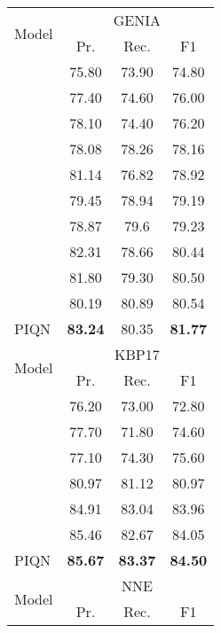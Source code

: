 \documentclass[11pt]{article}
\begin{document}
\begin{table}[]
\begin{tabular}{lccc}
\toprule
\multirow{2}{*}{Model}   & \multicolumn{3}{c}{GENIA}  \\
 \cmidrule(lr){2-4} 
& Pr.  & Rec. & F1  \\
\midrule

\citet{lin-etal-2019-sequence}       & 75.80  & 73.90 & 74.80  \\
\citet{luo-zhao-2020-bipartite}       & 77.40  & 74.60  & 76.00    \\
\citet{wang-etal-2020-hit}       & 78.10  & 74.40  & 76.20  \\
\citet{yang2022}  & 78.08 & 78.26 & 78.16 \\
\citet{li-etal-2020-unified} & 81.14 & 76.82 & 78.92 \\

\citet{wang-etal-2020-pyramid}       & 79.45  & 78.94  & 79.19     \\
\citet{yan2021bartner}  & 78.87  & 79.6  & 79.23     \\
\citet{tan2021sequencetoset}  & 82.31  & 78.66  & 80.44     \\
\citet{yu-etal-2020-named}       & 81.80  & 79.30  & 80.50     \\
\citet{shen2021locateandlabel} & 80.19 & 80.89  & 80.54  \\
\midrule
PIQN    & \textbf{83.24} & 80.35 & \textbf{81.77} \\
\toprule
\multirow{2}{*}{Model}   & \multicolumn{3}{c}{KBP17}  \\
 \cmidrule(lr){2-4} 
& Pr.  & Rec. & F1  \\
\midrule



\citet{DBLP:conf/tac/JiPZNMMC17}       & 76.20 & 73.00 & 72.80  \\
\citet{lin-etal-2019-sequence}       & 77.70  & 71.80 & 74.60  \\
\citet{luo-zhao-2020-bipartite}       & 77.10 & 74.30 & 75.60  \\
\citet{li-etal-2020-unified} & 80.97  & 81.12  & 80.97  \\
\citet{tan2021sequencetoset}  & 84.91  & 83.04  & 83.96     \\
\citet{shen2021locateandlabel} & {85.46}  & {82.67}  & {84.05}  \\
\midrule
PIQN & \textbf{85.67}  & \textbf{83.37} & \textbf{84.50} \\
\toprule








\multirow{2}{*}{Model}   & \multicolumn{3}{c}{NNE}  \\
 \cmidrule(lr){2-4} 
& Pr.  & Rec. & F1  \\
\midrule



\end{tabular}
\end{table}
\end{document}
